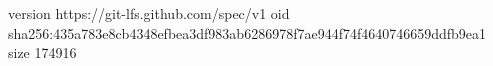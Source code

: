 version https://git-lfs.github.com/spec/v1
oid sha256:435a783e8cb4348efbea3df983ab6286978f7ae944f74f4640746659ddfb9ea1
size 174916
